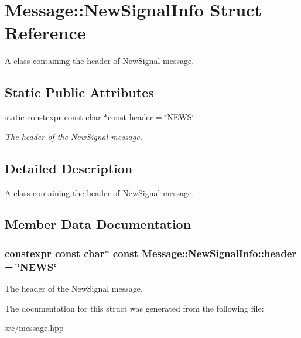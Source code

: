 \hypertarget{struct_message_1_1_new_signal_info}{}\section{Message\+:\+:New\+Signal\+Info Struct Reference}
\label{struct_message_1_1_new_signal_info}


A class containing the header of New\+Signal message.  


\subsection*{Static Public Attributes}
\begin{DoxyCompactItemize}
\item 
static constexpr const char $\ast$const \hyperlink{struct_message_1_1_new_signal_info_a5740f71d3d50d4bec68c80a5edebad25}{header} = \char`\"{}N\+E\+WS\char`\"{}
\begin{DoxyCompactList}\small\item\em The header of the New\+Signal message. \end{DoxyCompactList}\end{DoxyCompactItemize}


\subsection{Detailed Description}
A class containing the header of New\+Signal message. 

\subsection{Member Data Documentation}
\subsubsection[{\texorpdfstring{header}{header}}]{\setlength{\rightskip}{0pt plus 5cm}constexpr const char$\ast$ const Message\+::\+New\+Signal\+Info\+::header = \char`\"{}N\+E\+WS\char`\"{}\hspace{0.3cm}{\ttfamily [static]}}\hypertarget{struct_message_1_1_new_signal_info_a5740f71d3d50d4bec68c80a5edebad25}{}\label{struct_message_1_1_new_signal_info_a5740f71d3d50d4bec68c80a5edebad25}


The header of the New\+Signal message. 



The documentation for this struct was generated from the following file\+:\begin{DoxyCompactItemize}
\item 
src/\hyperlink{message_8hpp}{message.\+hpp}\end{DoxyCompactItemize}
